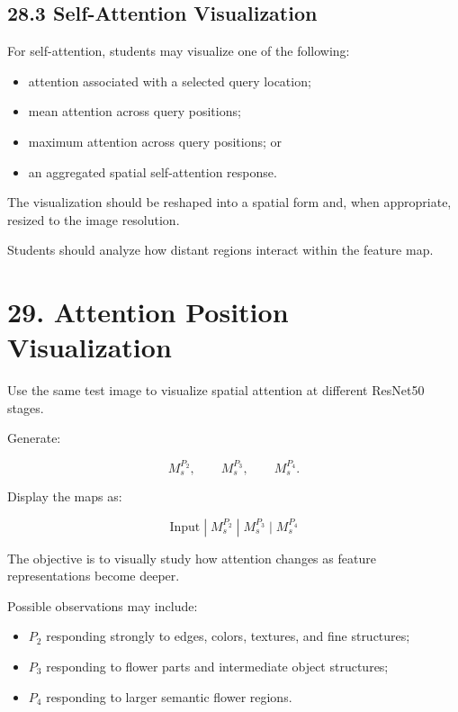 \documentclass[10pt]{article}
\begin{document}
\subsection*{28.3 Self-Attention Visualization}

For self-attention, students may visualize one of the following:

\begin{itemize}

\item attention associated with a selected query location;

\item mean attention across query positions;

\item maximum attention across query positions; or

\item an aggregated spatial self-attention response.

\end{itemize}

The visualization should be reshaped into a spatial form and, when
appropriate, resized to the image resolution.

Students should analyze how distant regions interact within the feature map.

\section*{29. Attention Position Visualization}

Use the same test image to visualize spatial attention at different ResNet50
stages.

Generate:

\[
M_s^{P_2},
\qquad
M_s^{P_3},
\qquad
M_s^{P_4}.
\]

Display the maps as:

\[
\boxed{
\text{Input}
\;|\;
M_s^{P_2}
\;|\;
M_s^{P_3}
\;|\;
M_s^{P_4}
}
\]

The objective is to visually study how attention changes as feature
representations become deeper.

Possible observations may include:

\begin{itemize}

\item $P_2$ responding strongly to edges, colors, textures, and fine
structures;

\item $P_3$ responding to flower parts and intermediate object structures;

\item $P_4$ responding to larger semantic flower regions.

\end{itemize}
\end{document}
